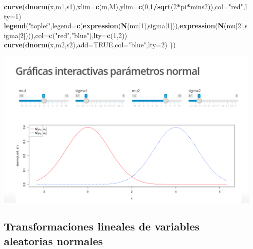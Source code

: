 \documentclass[]{book}
\newenvironment{Shaded}{\begin{snugshade}}{\end{snugshade}}
\newcommand{\DataTypeTok}[1]{\textcolor[rgb]{0.13,0.29,0.53}{#1}}
\newcommand{\DecValTok}[1]{\textcolor[rgb]{0.00,0.00,0.81}{#1}}
\newcommand{\KeywordTok}[1]{\textcolor[rgb]{0.13,0.29,0.53}{\textbf{#1}}}
\newcommand{\NormalTok}[1]{#1}
\newcommand{\OperatorTok}[1]{\textcolor[rgb]{0.81,0.36,0.00}{\textbf{#1}}}
\newcommand{\OtherTok}[1]{\textcolor[rgb]{0.56,0.35,0.01}{#1}}
\newcommand{\StringTok}[1]{\textcolor[rgb]{0.31,0.60,0.02}{#1}}
\begin{document}
\begin{Shaded}
\begin{Highlighting}[]
\KeywordTok{curve}\NormalTok{(}\KeywordTok{dnorm}\NormalTok{(x,m1,s1),}\DataTypeTok{xlim=}\KeywordTok{c}\NormalTok{(m,M),}\DataTypeTok{ylim=}\KeywordTok{c}\NormalTok{(}\DecValTok{0}\NormalTok{,}\DecValTok{1}\OperatorTok{/}\KeywordTok{sqrt}\NormalTok{(}\DecValTok{2}\OperatorTok{*}\NormalTok{pi}\OperatorTok{*}\NormalTok{mins2)),}\DataTypeTok{col=}\StringTok{"red"}\NormalTok{,}\DataTypeTok{lty=}\DecValTok{1}\NormalTok{)}
\KeywordTok{legend}\NormalTok{(}\StringTok{"toplef"}\NormalTok{,}\DataTypeTok{legend=}\KeywordTok{c}\NormalTok{(}\KeywordTok{expression}\NormalTok{(}\KeywordTok{N}\NormalTok{(mu[}\DecValTok{1}\NormalTok{],sigma[}\DecValTok{1}\NormalTok{])),}\KeywordTok{expression}\NormalTok{(}\KeywordTok{N}\NormalTok{(mu[}\DecValTok{2}\NormalTok{],sigma[}\DecValTok{2}\NormalTok{]))),}\DataTypeTok{col=}\KeywordTok{c}\NormalTok{(}\StringTok{"red"}\NormalTok{,}\StringTok{"blue"}\NormalTok{),}\DataTypeTok{lty=}\KeywordTok{c}\NormalTok{(}\DecValTok{1}\NormalTok{,}\DecValTok{2}\NormalTok{))}
\KeywordTok{curve}\NormalTok{(}\KeywordTok{dnorm}\NormalTok{(x,m2,s2),}\DataTypeTok{add=}\OtherTok{TRUE}\NormalTok{,}\DataTypeTok{col=}\StringTok{"blue"}\NormalTok{,}\DataTypeTok{lty=}\DecValTok{2}\NormalTok{)}
\NormalTok{\})}
\end{Highlighting}
\end{Shaded}

\href{https://joanby.shinyapps.io/DistribucionesNotables/}{\includegraphics{Images/noshinyImages/interactiva_normal1.png}}

\hypertarget{transformaciones-lineales-de-variables-aleatorias-normales}{%
\subsection{Transformaciones lineales de variables aleatorias normales}\label{transformaciones-lineales-de-variables-aleatorias-normales}}
\end{document}

